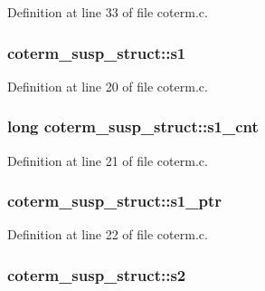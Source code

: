 Definition at line 33 of file coterm.\+c.

\subsubsection[{\texorpdfstring{s1}{s1}}]{ coterm\+\_\+susp\+\_\+struct\+::s1}\hypertarget{structcoterm__susp__struct_accdf66dd83db262a64598c2291c6ef43}{}\label{structcoterm__susp__struct_accdf66dd83db262a64598c2291c6ef43}


Definition at line 20 of file coterm.\+c.

\subsubsection[{\texorpdfstring{s1\+\_\+cnt}{s1_cnt}}]{\setlength{\rightskip}{0pt plus 5cm}long coterm\+\_\+susp\+\_\+struct\+::s1\+\_\+cnt}\hypertarget{structcoterm__susp__struct_afe4205a214331be9616c569842bd327a}{}\label{structcoterm__susp__struct_afe4205a214331be9616c569842bd327a}


Definition at line 21 of file coterm.\+c.

\subsubsection[{\texorpdfstring{s1\+\_\+ptr}{s1_ptr}}]{ coterm\+\_\+susp\+\_\+struct\+::s1\+\_\+ptr}\hypertarget{structcoterm__susp__struct_a41e38c5f97eef7748421706ce307aff3}{}\label{structcoterm__susp__struct_a41e38c5f97eef7748421706ce307aff3}


Definition at line 22 of file coterm.\+c.

\subsubsection[{\texorpdfstring{s2}{s2}}]{ coterm\+\_\+susp\+\_\+struct\+::s2}\hypertarget{structcoterm__susp__struct_a05b6ec317396a4ce3708cb651972aca0}{}\label{structcoterm__susp__struct_a05b6ec317396a4ce3708cb651972aca0}



